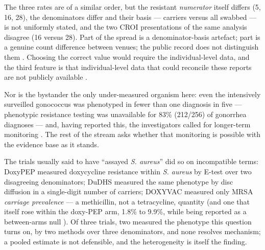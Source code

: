 \documentclass[10pt,letterpaper]{article}
\begin{document}
The three rates are of a similar order, but the resistant
\emph{numerator} itself differs (5, 16, 28), the denominators differ and
their basis --- carriers versus all swabbed --- is not uniformly stated,
and the two CROI presentations of the same analysis disagree (16 versus
28). Part of the spread is a denominator-basis artefact; part is a
genuine count difference between venues; the public record does not
distinguish them
\cite{luetkemeyer2023, luetkemeyer2023croi, cdc2024doxypep}. Choosing the
correct value would require the individual-level data, and the third
feature is that individual-level data that could reconcile these reports
are not publicly available \cite{luetkemeyer2023}.

Nor is the bystander the only under-measured organism here: even the
intensively surveilled gonococcus was phenotyped in fewer than one
diagnosis in five --- phenotypic resistance testing was unavailable for
83\% (212/256) of gonorrhea diagnoses --- and, having reported this, the
investigators called for longer-term monitoring
\cite{luetkemeyer2023croi}. The rest of the stream asks whether that
monitoring is possible with the evidence base as it stands.

The trials usually said to have ``assayed \emph{S. aureus}'' did so on
incompatible terms: DoxyPEP
measured doxycycline resistance within \emph{S. aureus} by E-test over
two disagreeing denominators; DuDHS measured the same phenotype by disc
diffusion in a single-digit number of carriers; DOXYVAC measured only
MRSA \emph{carriage prevalence} --- a methicillin, not a tetracycline,
quantity (and one that itself rose within the doxy-PEP arm, 1.8\% to
9.9\%, while being reported as a between-arms null
\cite{vanbaelen2024c}). Of three trials, two measured the phenotype
this question turns on, by two methods over three denominators, and none
resolves mechanism; a pooled estimate is not defensible, and the
heterogeneity is itself the finding.
\end{document}
